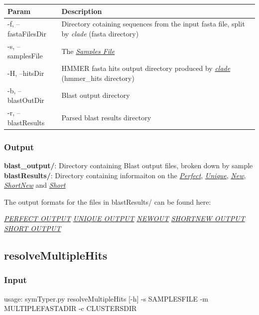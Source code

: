 \documentclass[letterpaper,10pt,english]{sphinxmanual}
\begin{document}
\begin{tabulary}{\linewidth}{|L|L|}
\hline
\textsf{\relax 
Param
} & \textsf{\relax 
Description
}\\
\hline
-f, --fastaFilesDir
 & 
Directory cotaining sequences from the input fasta file, split by \emph{clade} (fasta directory)
\\

-s, --samplesFile
 & 
The {\hyperref[defs:samplefile]{\emph{Samples File}}}
\\

-H, --hitsDir
 & 
HMMER fasta hits output directory produced by {\hyperref[CommandLine:clade]{\emph{clade}}} (hmmer\_hits directory)
\\

-b, --blastOutDir
 & 
Blast output directory
\\

-r, --blastResults
 & 
Parsed blast results directory
\\
\hline\end{tabulary}



\subsubsection{Output}
\label{CommandLine:output}
\textbf{blast\_output/}: Directory containing Blast output files, broken down by sample
\textbf{blastResults/}: Directory containing informaiton on the {\hyperref[defs:perfect]{\emph{Perfect}}}, {\hyperref[defs:unique]{\emph{Unique}}}, {\hyperref[defs:new]{\emph{New}}}, {\hyperref[defs:shortnew]{\emph{ShortNew}}} and {\hyperref[defs:short]{\emph{Short}}}

The output formats for the files in blastResults/ can be found here:

{\hyperref[defs:perfectout]{\emph{PERFECT OUTPUT}}}
{\hyperref[defs:uniqueout]{\emph{UNIQUE OUTPUT}}}
{\hyperref[defs:newout]{\emph{NEWOUT}}}
{\hyperref[defs:shortnewout]{\emph{SHORTNEW OUTPUT}}}
{\hyperref[defs:shortout]{\emph{SHORT OUTPUT}}}


\subsection{resolveMultipleHits}
\label{CommandLine:id4}\label{CommandLine:resolvemultiplehits}

\subsubsection{Input}
\label{CommandLine:id5}
usage: symTyper.py resolveMultipleHits {[}-h{]} -s SAMPLESFILE -m MULTIPLEFASTADIR -c CLUSTERSDIR
\end{document}
